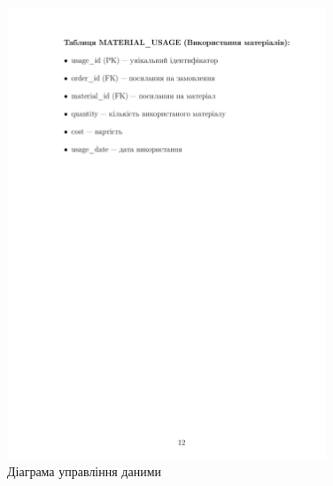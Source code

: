 \documentclass[14pt,a4paper]{extarticle}
\begin{document}
\begin{figure}[h!]
\centering
\includegraphics[width=0.85\textwidth]{diagrams/diagram-13.png}
\caption{Діаграма управління даними}
\end{figure}

\newpage
\end{document}
